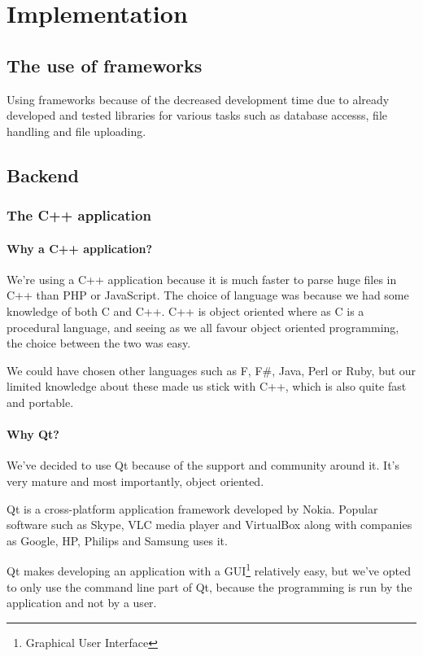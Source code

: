 \chapter{Implementation}
\section{The use of frameworks}
Using frameworks because of the decreased development time due to already developed and tested libraries for various tasks such as database accesss, file handling and file uploading.

\section{Backend}
\subsection{The C++ application}
\subsubsection{Why a C++ application?}
We're using a C++ application because it is much faster to parse huge files in C++ than PHP or JavaScript.
The choice of language was because we had some knowledge of both C and C++. C++ is object oriented where as C is a procedural language, and seeing as we all favour object oriented programming, the choice between the two was easy.

We could have chosen other languages such as F, F\#, Java, Perl or Ruby, but our limited knowledge about these made us stick with C++, which is also quite fast and portable.

\subsubsection{Why Qt?}
We've decided to use Qt because of the support and community around it. It's very mature and most importantly, object oriented.

Qt is a cross-platform application framework developed by Nokia. Popular software such as Skype, VLC media player and VirtualBox along with companies as Google, HP, Philips and Samsung uses it.

Qt makes developing an application with a GUI\footnote{Graphical User Interface} relatively easy, but we've opted to only use the command line part of Qt, because the programming is run by the application and not by a user.

